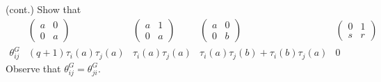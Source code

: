\documentclass[../Odyssey_Project.tex]{subfiles}
\begin{document}
\begin{exercise}
\label{ex:16.14}
(cont.) Show that
\[
\begin{array}{c|cccc}
 & \begin{pmatrix} a & 0 \\ 0 & a \end{pmatrix} & \begin{pmatrix} a & 1 \\ 0 & a \end{pmatrix} & \begin{pmatrix} a & 0 \\ 0 & b \end{pmatrix} & \begin{pmatrix} 0 & 1 \\ s & r \end{pmatrix} \\
\hline
\theta_{ij}^G & (q + 1) \tau_i(a) \tau_j(a) & \tau_i(a) \tau_j(a) & \tau_i(a) \tau_j(b) + \tau_i(b) \tau_j(a) & 0
\end{array}
\]
Observe that $\theta_{ij}^G = \theta_{ji}^G$.
\end{exercise}
\end{document}
